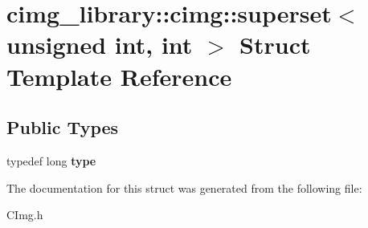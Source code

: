 \hypertarget{structcimg__library_1_1cimg_1_1superset_3_01unsigned_01int_00_01int_01_4}{\section{cimg\-\_\-library\-:\-:cimg\-:\-:superset$<$ unsigned int, int $>$ Struct Template Reference}
\label{structcimg__library_1_1cimg_1_1superset_3_01unsigned_01int_00_01int_01_4}
}
\subsection*{Public Types}
\begin{DoxyCompactItemize}
\item 
\hypertarget{structcimg__library_1_1cimg_1_1superset_3_01unsigned_01int_00_01int_01_4_a727e84b0ed1cb16609657c5dfd5fb266}{typedef long {\bfseries type}}\label{structcimg__library_1_1cimg_1_1superset_3_01unsigned_01int_00_01int_01_4_a727e84b0ed1cb16609657c5dfd5fb266}

\end{DoxyCompactItemize}


The documentation for this struct was generated from the following file\-:\begin{DoxyCompactItemize}
\item 
C\-Img.\-h\end{DoxyCompactItemize}
